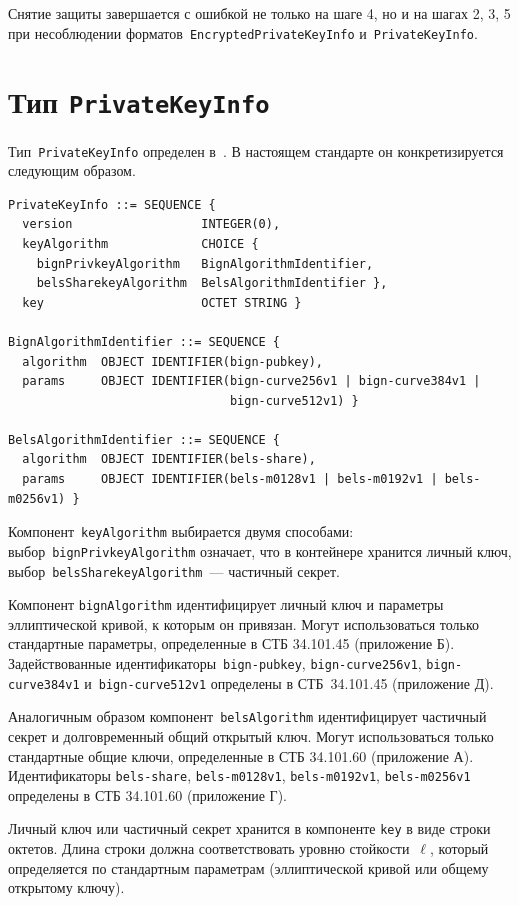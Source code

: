 Снятие защиты завершается с ошибкой не только на шаге 4, но и на 
шагах 2, 3, 5 при несоблюдении форматов~\texttt{EncryptedPrivateKeyInfo} 
и~\texttt{PrivateKeyInfo}. 

\section{Тип \texttt{PrivateKeyInfo}}\label{CONT.PT}

Тип~\texttt{PrivateKeyInfo} определен в~\cite{PKCS8}.
В настоящем стандарте он конкретизируется следующим образом.
%
\begin{verbatim}
PrivateKeyInfo ::= SEQUENCE {
  version                  INTEGER(0),
  keyAlgorithm             CHOICE {
    bignPrivkeyAlgorithm   BignAlgorithmIdentifier,
    belsSharekeyAlgorithm  BelsAlgorithmIdentifier },
  key                      OCTET STRING }

BignAlgorithmIdentifier ::= SEQUENCE {
  algorithm  OBJECT IDENTIFIER(bign-pubkey),
  params     OBJECT IDENTIFIER(bign-curve256v1 | bign-curve384v1 | 
                               bign-curve512v1) }

BelsAlgorithmIdentifier ::= SEQUENCE {
  algorithm  OBJECT IDENTIFIER(bels-share),
  params     OBJECT IDENTIFIER(bels-m0128v1 | bels-m0192v1 | bels-m0256v1) }
\end{verbatim}

Компонент~\texttt{keyAlgorithm} выбирается двумя способами:
выбор~\texttt{bignPrivkeyAlgorithm} означает, что в контейнере хранится личный 
ключ, выбор~\texttt{belsSharekeyAlgorithm}~--- частичный секрет. 

Компонент \texttt{bignAlgorithm} идентифицирует личный ключ и параметры 
эллиптической кривой, к которым он привязан. Могут использоваться
только стандартные параметры, определенные в СТБ 34.101.45 (приложение Б). 
%
Задействованные идентификаторы~\texttt{bign-pubkey}, 
\texttt{bign-curve256v1}, \texttt{bign-curve384v1} 
и~\texttt{bign-curve512v1} определены в СТБ~34.101.45 (приложение Д).

Аналогичным образом компонент~\texttt{belsAlgorithm} идентифицирует 
частичный секрет и долговременный общий открытый ключ. 
Могут использоваться только стандартные общие ключи, 
определенные в СТБ 34.101.60 (приложение А). 
Идентификаторы \texttt{bels-share}, \texttt{bels-m0128v1}, 
\texttt{bels-m0192v1}, \texttt{bels-m0256v1} определены в СТБ 34.101.60 
(приложение Г).

Личный ключ или частичный секрет хранится в компоненте \texttt{key}
в виде строки октетов. Длина строки должна соответствовать уровню
стойкости~$\ell$, который определяется по стандартным параметрам
(эллиптической кривой или общему открытому ключу).

